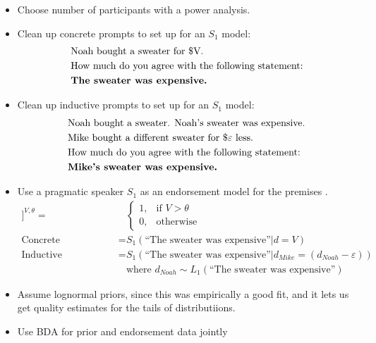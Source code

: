 \documentclass{article}
\newcommand{\s}[1]{``#1''}
\begin{document}
   \begin{itemize}
      \item{Choose number of participants with a power analysis.}
      \item{Clean up concrete prompts to set up for an $S_1$ model:
      \begin{align*}
         &\text{Noah bought a sweater for \$V.} \\
         &\text{How much do you agree with the following statement:} \\
         &\text{\bf The sweater was expensive.}
      \end{align*}
      }
      \item{Clean up inductive prompts to set up for an $S_1$ model:
      \begin{align*}
         &\text{Noah bought a sweater. Noah's sweater was expensive.} \\
         &\text{Mike bought a different sweater for \$$\varepsilon$ less.} \\
         &\text{How much do you agree with the following statement:} \\
         &\text{\bf Mike's sweater was expensive.}
      \end{align*}
      }
      \item{Use a pragmatic speaker $S_1$ as an endorsement model for the premises \cite{DegenGoodman2014-Cogsci, franke2014typical}.
      \begin{align*}
         [[\text{The sweater was expensive.}]]^{V, \theta} =& \begin{cases}
             1, & \text{if } V>\theta \\
             0, & \text{otherwise}
         \end{cases} \\
         \text{Concrete Endorsement} =& S_1(\text{\s{The sweater was expensive}}| d=V) \\
         \text{Inductive Endorsement} =& S_1(\text{\s{The sweater was expensive}} | d_{Mike}=(d_{Noah}-\varepsilon)) \\
         & \text{where } d_{Noah} \sim L_1(\text{\s{The sweater was expensive}})
      \end{align*}
      }
      \item{Assume lognormal priors, since this was empirically a good fit, and it lets us get quality estimates for the tails of distributiions.}
      \item{Use BDA for prior and endorsement data jointly}
   \end{itemize}
\end{document}
